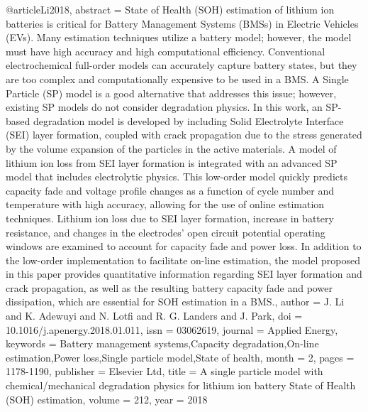 @article{Li2018,
   abstract = {State of Health (SOH) estimation of lithium ion batteries is critical for Battery Management Systems (BMSs) in Electric Vehicles (EVs). Many estimation techniques utilize a battery model; however, the model must have high accuracy and high computational efficiency. Conventional electrochemical full-order models can accurately capture battery states, but they are too complex and computationally expensive to be used in a BMS. A Single Particle (SP) model is a good alternative that addresses this issue; however, existing SP models do not consider degradation physics. In this work, an SP-based degradation model is developed by including Solid Electrolyte Interface (SEI) layer formation, coupled with crack propagation due to the stress generated by the volume expansion of the particles in the active materials. A model of lithium ion loss from SEI layer formation is integrated with an advanced SP model that includes electrolytic physics. This low-order model quickly predicts capacity fade and voltage profile changes as a function of cycle number and temperature with high accuracy, allowing for the use of online estimation techniques. Lithium ion loss due to SEI layer formation, increase in battery resistance, and changes in the electrodes’ open circuit potential operating windows are examined to account for capacity fade and power loss. In addition to the low-order implementation to facilitate on-line estimation, the model proposed in this paper provides quantitative information regarding SEI layer formation and crack propagation, as well as the resulting battery capacity fade and power dissipation, which are essential for SOH estimation in a BMS.},
   author = {J. Li and K. Adewuyi and N. Lotfi and R. G. Landers and J. Park},
   doi = {10.1016/j.apenergy.2018.01.011},
   issn = {03062619},
   journal = {Applied Energy},
   keywords = {Battery management systems,Capacity degradation,On-line estimation,Power loss,Single particle model,State of health},
   month = {2},
   pages = {1178-1190},
   publisher = {Elsevier Ltd},
   title = {A single particle model with chemical/mechanical degradation physics for lithium ion battery State of Health (SOH) estimation},
   volume = {212},
   year = {2018}
}
